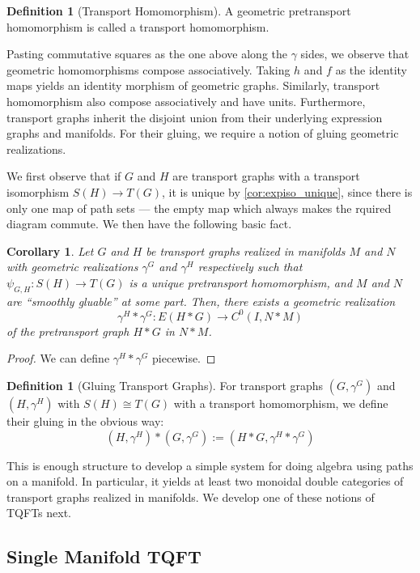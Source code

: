 \documentclass{amsart}
\renewcommand{\to}[1][]{\stackrel{#1}{\longrightarrow}}
\numberwithin{thm}{section}
\newtheorem{cor}[thm]{Corollary}
\theoremstyle{definition}
\newtheorem{defn}[thm]{Definition}
\begin{document}
\begin{defn}[Transport Homomorphism]
A geometric pretransport homomorphism is called a transport homomorphism.
\end{defn}

Pasting commutative squares as the one above along the $\gamma$ sides, we
observe that geometric homomorphisms compose associatively. Taking
$h$ and $f$ as the identity maps yields an identity morphism of geometric
graphs. Similarly, transport homomorphism also compose associatively and have
units. Furthermore, transport graphs inherit the disjoint union from their
underlying expression graphs and manifolds. For their gluing, we require a
notion of gluing geometric realizations.

We first observe that if $G$ and $H$ are transport graphs with a transport
isomorphism $S(H) \to T(G)$, it is unique by \ref{cor:expiso_unique}, since
there is only one map of path sets --- the empty map which always makes the
rquired diagram commute. We then have the following basic fact.

\begin{cor}
Let $G$ and $H$ be transport graphs realized in manifolds
$M$ and $N$ with geometric realizations $\gamma^G$ and
$\gamma^H$ respectively such that $\psi_{G, H} : S(H) \to T(G)$ is a unique
pretransport homomorphism, and $M$ and $N$ are ``smoothly gluable'' at some
part. Then, there exists a geometric realization
\[
  \gamma^H * \gamma^G : E(H * G) \to C^0(I, N * M)
\]
of the pretransport graph $H * G$ in $N * M$.
\end{cor}
\begin{proof}
We can define $\gamma^H * \gamma^G$ piecewise.
\end{proof}

\begin{defn}[Gluing Transport Graphs]
For transport graphs $(G, \gamma^G)$ and $(H, \gamma^H)$ with $S(H) \cong T(G)$
with a transport homomorphism, we define their gluing in the obvious way:
\[
  (H, \gamma^H) * (G, \gamma^G) := (H * G, \gamma^H * \gamma^G)
\]
\end{defn}

This is enough structure to develop a simple system for doing algebra using
paths on a manifold. In particular, it yields at least two monoidal double
categories of transport graphs realized in manifolds. We develop one of these
notions of TQFTs next.

%

\subsection{Single Manifold TQFT}\label{subsec:sing_man_tqft}
\end{document}
